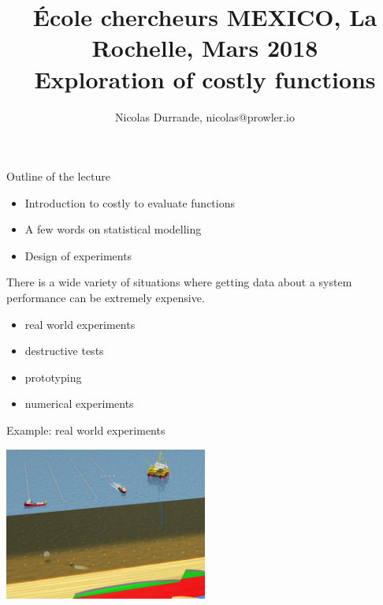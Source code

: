 \documentclass{beamer}
\title[\'Ecole chercheurs MEXICO]{ \small \'Ecole chercheurs MEXICO, La Rochelle, Mars 2018\\ \vspace{3mm} \LARGE Exploration of costly functions}
\author[\quad La Rochelle, March 2018]{Nicolas Durrande, nicolas@prowler.io}
\institute[]{PROWLER.io, Cambridge -- Mines St-\'Etienne}
\date{\null}
\begin{document}
\begin{frame}
  \titlepage
\end{frame}

\begin{frame}{}
Outline of the lecture
\vspace{0.2cm}
\begin{itemize}
	\item Introduction to costly to evaluate functions
    \item A few words on statistical modelling
	\item Design of experiments
\end{itemize}
\end{frame}

\begin{frame}{}
There is a wide variety of situations where getting data about a system performance can be extremely expensive.
\begin{itemize}
	\item real world experiments
	\item destructive tests
	\item prototyping
	\item numerical experiments
\end{itemize}
\end{frame}

\begin{frame}{}
\begin{exampleblock}{Example: real world experiments}
\begin{center}
\includegraphics[height=5cm]{figures/drilling}
\end{center}
\end{exampleblock}
\end{frame}
\end{document}
